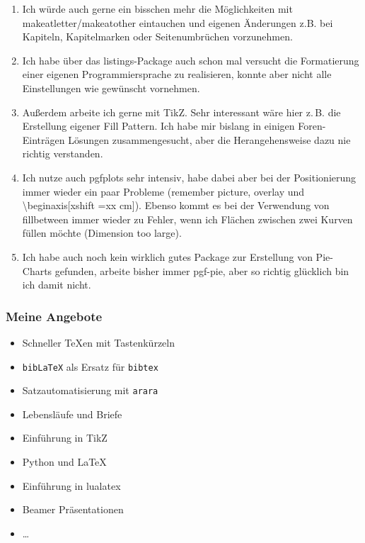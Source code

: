 \documentclass[ngerman]{beamer}
\newcommand{\bb}{\textasteriskcentered\textasteriskcentered}
\newcommand{\cc}{\textasteriskcentered\textasteriskcentered\textasteriskcentered}
\begin{document}
\begin{frame}[allowframebreaks]
\begin{enumerate}
\item Ich würde auch gerne ein bisschen mehr die Möglichkeiten mit makeatletter/makeatother eintauchen und eigenen Änderungen z.B. bei Kapiteln, Kapitelmarken oder Seitenumbrüchen vorzunehmen. \bb

\item Ich habe über das listings-Package auch schon mal versucht die Formatierung einer eigenen Programmiersprache zu realisieren, konnte aber nicht alle Einstellungen wie gewünscht vornehmen. \bb

\item 
Außerdem arbeite ich gerne mit TikZ. Sehr interessant wäre hier z.\,B. die Erstellung eigener Fill Pattern. Ich habe mir bislang in einigen Foren-Einträgen Lösungen zusammengesucht, aber die Herangehensweise dazu nie richtig verstanden. \cc

\item Ich nutze auch pgfplots sehr intensiv, habe dabei aber bei der Positionierung immer wieder ein paar Probleme (remember picture, overlay und \textbackslash  begin{axis}[xshift =xx cm]).
Ebenso kommt es bei der Verwendung von fillbetween immer wieder zu Fehler, wenn ich Flächen zwischen zwei Kurven füllen möchte (Dimension too large). \cc

\item 
Ich habe auch noch kein wirklich gutes Package zur Erstellung von Pie-Charts gefunden, arbeite bisher immer pgf-pie, aber so richtig glücklich bin ich damit nicht. \bb

\end{enumerate}
\end{frame}

\begin{frame}
\frametitle{Meine Angebote}

\begin{itemize}
\item Schneller TeXen mit Tastenkürzeln \checkmark
\item \texttt{bibLaTeX} als Ersatz für \texttt{bibtex}
\item Satzautomatisierung mit \texttt{arara} \checkmark
\item Lebensläufe und Briefe
\item Einführung in TikZ
\item Python und LaTeX
\item Einführung in lualatex
\item Beamer Präsentationen
\item \ldots
\end{itemize}
\end{frame}
\end{document}
